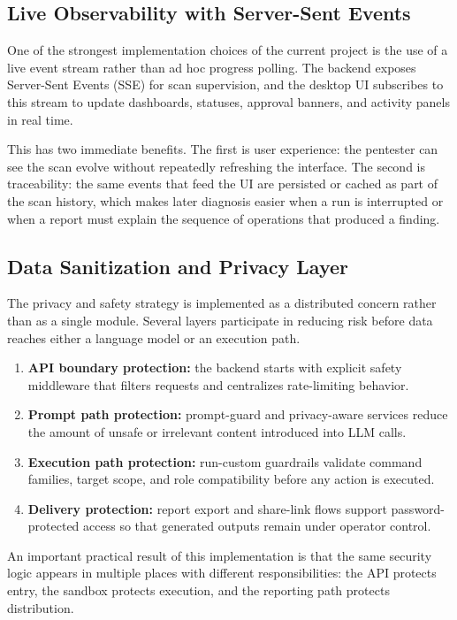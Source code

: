 \documentclass[12pt,a4paper]{report}
\begin{document}
\subsection{Live Observability with Server-Sent Events}

One of the strongest implementation choices of the current project is the use of a
live event stream rather than ad hoc progress polling. The backend exposes
Server-Sent Events (SSE) for scan supervision, and the desktop UI subscribes to this
stream to update dashboards, statuses, approval banners, and activity panels in real
time.

This has two immediate benefits. The first is user experience: the pentester can see
the scan evolve without repeatedly refreshing the interface. The second is
traceability: the same events that feed the UI are persisted or cached as part of the
scan history, which makes later diagnosis easier when a run is interrupted or when a
report must explain the sequence of operations that produced a finding.

\subsection{Data Sanitization and Privacy Layer}

The privacy and safety strategy is implemented as a distributed concern rather than
as a single module. Several layers participate in reducing risk before data reaches
either a language model or an execution path.

\begin{enumerate}
    \item \textbf{API boundary protection:} the backend starts with explicit safety
    middleware that filters requests and centralizes rate-limiting behavior.
    \item \textbf{Prompt path protection:} prompt-guard and privacy-aware services
    reduce the amount of unsafe or irrelevant content introduced into LLM calls.
    \item \textbf{Execution path protection:} run-custom guardrails validate command
    families, target scope, and role compatibility before any action is executed.
    \item \textbf{Delivery protection:} report export and share-link flows support
    password-protected access so that generated outputs remain under operator control.
\end{enumerate}

An important practical result of this implementation is that the same security logic
appears in multiple places with different responsibilities: the API protects entry,
the sandbox protects execution, and the reporting path protects distribution.
\end{document}

